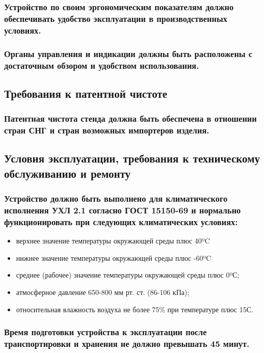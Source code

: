 \documentclass[a4paper]{bsuir-tor}
\begin{document}
\subsubsection{Устройство по своим эргономическим показателям
  должно обеспечивать удобство эксплуатации в производственных условиях.}

\subsubsection{Органы управления и индикации должны быть
  расположены с достаточным обзором и удобством использования.}

\subsection{Требования к патентной чистоте}

\subsubsection{Патентная чистота стенда должна быть обеспечена
  в отношении стран СНГ и стран возможных импортеров изделия.}

\subsection{Условия эксплуатации,
  требования к техническому обслуживанию и ремонту}

\subsubsection{Устройство должно быть выполнено для климатического
  исполнения УХЛ 2.1 согласно ГОСТ 15150-69
  и нормально функционировать при следующих климатических условиях:}

\begin{itemize}
\item верхнее значение температуры окружающей среды плюс 40ºC
\item нижнее значение температуры окружающей среды плюс -60ºC 
\item среднее (рабочее) значение температуры окружающей среды плюс 0ºС;  
\item атмосферное давление 650-800 мм рт. ст. (86-106 кПа);
\item относительная влажность воздуха не более 75\% при температуре плюс 15С.
\end{itemize}

\subsubsection{Время подготовки устройства к эксплуатации после
  транспортировки и хранения не должно превышать 45 минут.}
\end{document}
